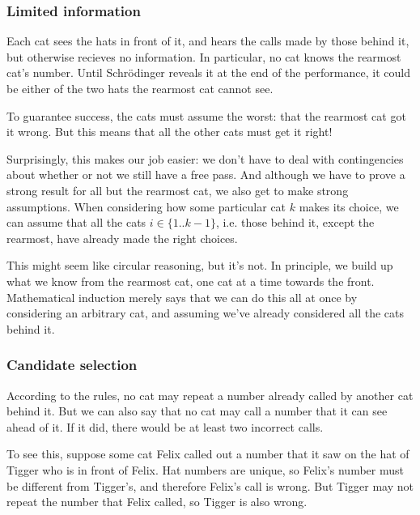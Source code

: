\documentclass[10pt,a4paper]{scrartcl}
\begin{document}
\subsubsection{Limited information}

Each cat sees the hats in front of it, and hears the calls made by those behind
it, but otherwise recieves no information. In particular, no cat knows the
rearmost cat's number. Until Schr\"odinger reveals it at the end of the
performance, it could be either of the two hats the rearmost cat cannot see.

To guarantee success, the cats must assume the worst: that the rearmost cat got
it wrong. But this means that all the other cats must get it right!

Surprisingly, this makes our job easier: we don't have to deal with
contingencies about whether or not we still have a free pass. And although we
have to prove a strong result for all but the rearmost cat, we also get to make
strong assumptions. When considering how some particular cat $k$ makes its
choice, we can assume that all the cats $i \in \{1..k-1\}$, i.e. those behind
it, except the rearmost, have already made the right choices.

This might seem like circular reasoning, but it's not. In principle, we build
up what we know from the rearmost cat, one cat at a time towards the front.
Mathematical induction merely says that we can do this all at once by
considering an arbitrary cat, and assuming we've already considered all the
cats behind it.

\subsubsection{Candidate selection}

According to the rules, no cat may repeat a number already called by another
cat behind it. But we can also say that no cat may call a number that it can
see ahead of it. If it did, there would be at least two incorrect calls.

To see this, suppose some cat Felix called out a number that it saw on the hat
of Tigger who is in front of Felix. Hat numbers are unique, so Felix's number
must be different from Tigger's, and therefore Felix's call is wrong. But
Tigger may not repeat the number that Felix called, so Tigger is also wrong.




\end{document}
